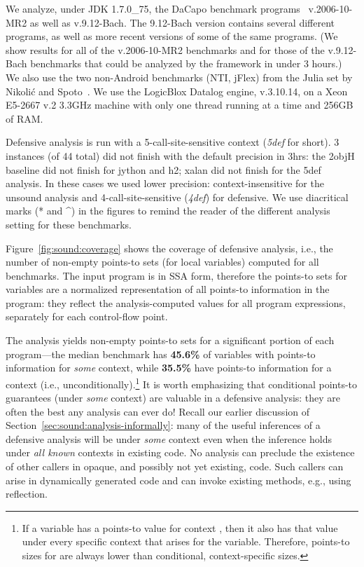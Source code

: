 We analyze, under JDK 1.7.0\_75, the DaCapo benchmark programs~\cite{oopsla:2006:Blackburn} v.2006-10-MR2 as well as v.9.12-Bach. The 9.12-Bach version contains several different programs, as well as more recent versions of some of the same programs. (We show results for all of the v.2006-10-MR2 benchmarks and for those of the v.9.12-Bach benchmarks that could be analyzed by the \doop{} framework in under 3 hours.) We also use the two non-Android benchmarks (NTI, jFlex) from the Julia set by Nikoli\'{c} and Spoto~\cite{ictac:2012:Nikolic}. We use the LogicBlox Datalog engine, v.3.10.14, on a Xeon E5-2667 v.2 3.3GHz machine with only one thread running at a time and 256GB of RAM.

Defensive analysis is run with a 5-call-site-sensitive context (\emph{5def} for short). 3 instances (of 44 total) did not finish with the default precision in 3hrs: the 2objH baseline did not finish for jython and h2; xalan did not finish for the 5def analysis. In these cases we used lower precision: context-insensitive for the unsound analysis and 4-call-site-sensitive (\emph{4def}) for defensive. We use diacritical marks (* and \^{}) in the figures to remind the reader of the different analysis setting for these benchmarks.


Figure~\ref{fig:sound:coverage} shows the coverage of defensive analysis, i.e., the number of non-empty points-to sets (for local variables) computed for all benchmarks. The input program is in SSA form, therefore the points-to sets for variables are a normalized representation of all points-to information in the program: they reflect the analysis-computed values for all program expressions, separately for each control-flow point.

The analysis yields non-empty points-to sets for a significant portion of each program---the median benchmark has \textbf{45.6\%} of variables with points-to information for \emph{some} context, while \textbf{35.5\%} have points-to information for a context \ctxInit{} (i.e., unconditionally).\footnote{If a variable has a points-to value for context \ctxInit{}, then it also has that value under every specific context that arises for the variable. Therefore, points-to sizes for \ctxInit{} are always lower than conditional, context-specific sizes.} It is worth emphasizing that conditional points-to guarantees (under \emph{some} context) are valuable in a defensive analysis: they are often the best any analysis can ever do! Recall our earlier discussion of Section~\ref{sec:sound:analysis-informally}: many of the useful inferences of a defensive analysis will be under \emph{some} context even when the inference holds under \emph{all known} contexts in existing code. No analysis can preclude the existence of other callers in opaque, and possibly not yet existing, code. Such callers can arise in dynamically generated code and can invoke existing methods, e.g., using reflection.

